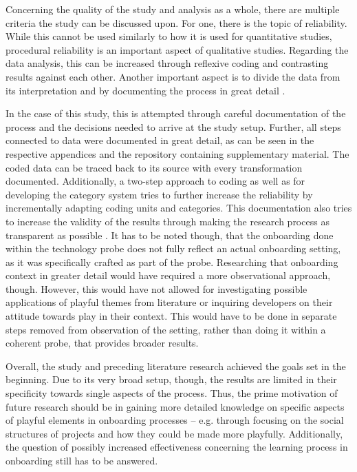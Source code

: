 Concerning the quality of the study and analysis as a whole, there are multiple criteria the study can be discussed upon. For one, there is the topic of reliability. While this cannot be used similarly to how it is used for quantitative studies, procedural reliability is an important aspect of qualitative studies. Regarding the data analysis, this can be increased through reflexive coding and contrasting results against each other. Another important aspect is to divide the data from its interpretation and by documenting the process in great detail \cite[p. 541-543]{flick2018introduction}.

In the case of this study, this is attempted through careful documentation of the process and the decisions needed to arrive at the study setup. Further, all steps connected to data were documented in great detail, as can be seen in the respective appendices and the repository containing supplementary material. The coded data can be traced back to its source with every transformation documented. Additionally, a two-step approach to coding as well as for developing the category system tries to further increase the reliability by incrementally adapting coding units and categories. This documentation also tries to increase the validity of the results through making the research process as transparent as possible \cite[p. 546]{flick2018introduction}. It has to be noted though, that the onboarding done within the technology probe does not fully reflect an actual onboarding setting, as it was specifically crafted as part of the probe. Researching that onboarding context in greater detail would have required a more observational approach, though. However, this would have not allowed for investigating possible applications of playful themes from literature or inquiring developers on their attitude towards play in their context. This would have to be done in separate steps removed from observation of the setting, rather than doing it within a coherent probe, that provides broader results.

Overall, the study and preceding literature research achieved the goals set in the beginning. Due to its very broad setup, though, the results are limited in their specificity towards single aspects of the process. Thus, the prime motivation of future research should be in gaining more detailed knowledge on specific aspects of playful elements in onboarding processes -- e.g. through focusing on the social structures of projects and how they could be made more playfully. Additionally, the question of possibly increased effectiveness concerning the learning process in onboarding still has to be answered.

